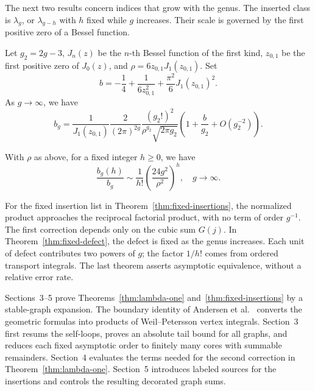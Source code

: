 The next two results concern indices that grow with the genus.
The inserted class is $\lambda_g$, or $\lambda_{g-h}$ with $h$
fixed while $g$ increases. Their scale is governed by the first
positive zero of a Bessel function.

\begin{thm}
\label{thm:top-hodge}
Let $g_2=2g-3$, $J_n(z)$ be the $n$-th Bessel function of the first kind, $z_{0,1}$ be the first
positive zero of $J_0(z)$, and $\rho=6z_{0,1}J_1(z_{0,1})$.
Set
\[b=-\frac{1}{4}+\frac{1}{6z_{0,1}^2}+\frac{\pi^2}{6}J_1(z_{0,1})^2.\]
As $g\to\infty$, we have
\begin{equation}
b_g=\frac{1}{J_1(z_{0,1})}\frac{2}{(2\pi)^{2g}}\frac{(g_2!)^2}{\rho^{g_2}\sqrt{2\pi g_2}}\left(
1+\frac{b}{g_2}+O(g_2^{-2})\right).
\label{eq:g111}
\end{equation}
\end{thm}

\begin{thm}
\label{thm:fixed-defect}
With $\rho$ as above, for a fixed integer $h\geq0$, we have
\begin{equation}
\frac{b_g(h)}{b_g}\sim \frac{1}{h!}\left(\frac{24g^2}{\rho^2}\right)^h,\quad g\to\infty.
\label{eq:gh11}
\end{equation}
\end{thm}

For the fixed insertion list in
Theorem~\ref{thm:fixed-insertions}, the normalized product
approaches the reciprocal factorial product, with no term of order
$g^{-1}$. The first correction depends only on the cubic sum
$G(j)$. In Theorem~\ref{thm:fixed-defect}, the defect is fixed as
the genus increases. Each unit of defect contributes two powers
of $g$; the factor $1/h!$ comes from ordered transport integrals.
The last theorem asserts asymptotic equivalence, without a relative
error rate.

Sections~3--5 prove Theorems~\ref{thm:lambda-one}
and~\ref{thm:fixed-insertions} by a stable-graph expansion.
The boundary identity of Andersen et al.\
\cite[Lemma 3.10]{ABCDGLW23} converts the geometric formulas into
products of Weil--Petersson vertex integrals. Section~3 first
resums the self-loops, proves an absolute tail bound for all graphs,
and reduces each fixed asymptotic order to finitely many cores
with summable remainders. Section~4 evaluates the terms needed
for the second correction in Theorem~\ref{thm:lambda-one}.
Section~5 introduces labeled sources for the insertions and
controls the resulting decorated graph sums.

